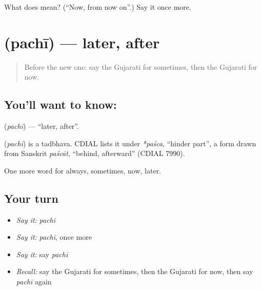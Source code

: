 \begin{tcolorbox}[breakable,colback=teal!4,colframe=teal!35!black,title={Before you move on}]
What does  mean? (\textquotedblleft{}Now, from now on\textquotedblright{}.) Say it once more.
\end{tcolorbox}
\section[\texorpdfstring{\gu{પછી} (pachī)}{પછી (pachī)}]{ (pachī) — later, after}

\label{lesson:GU-C77-later}



\begin{quote}
Before the new one: say the Gujarati for sometimes, then the Gujarati for now.
\end{quote}

\subsection*{You'll want to know: }
\textbf{} (\emph{pachī}) — \textquotedblleft{}later, after\textquotedblright{}.

\begin{cousinweb}
\textbf{} (\emph{pachī}) is a tadbhava. CDIAL lists it under \emph{*paśca}, \textquotedblleft{}hinder part\textquotedblright{}, a form drawn from Sanskrit \emph{paścāt}, \textquotedblleft{}behind, afterward\textquotedblright{} (CDIAL 7990).
\end{cousinweb}

\begin{grammarlens}[title={What you've built}]
One more word for always, sometimes, now, later.
\end{grammarlens}

\subsection*{Your turn}
\begin{itemize}
\raggedright
  \item \emph{Say it:} \emph{pachī}
  \item \emph{Say it:} \emph{pachī}, once more
  \item \emph{Say it:} say \emph{pachī}
  \item \emph{Recall:} say the Gujarati for sometimes, then the Gujarati for now, then say \emph{pachī} again
\end{itemize}

